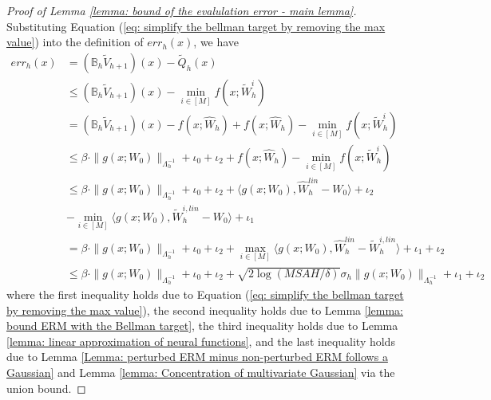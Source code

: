 \documentclass{article} \usepackage{iclr2023/iclr2023_conference,times}
\begin{document}
\begin{proof}[Proof of Lemma \ref{lemma: bound of the evalulation error - main lemma}]
Substituting Equation (\ref{eq: simplify the bellman target by removing the max value}) into the definition of $err_h(x)$, we have
\begin{align*}
    err_h(x) &= (\mathbb{B}_h \tilde{V}_{h+1})(x) -\tilde{Q}_h(x) \\ 
    &\leq (\mathbb{B}_h \tilde{V}_{h+1})(x) - \min_{i \in [M]} f(x; \tilde{W}^i_h) \\ 
    &= (\mathbb{B}_h \tilde{V}_{h+1})(x) - f(x; \hat{W}_h) + f(x; \hat{W}_h)  -\min_{i \in [M]} f(x; \tilde{W}^i_h) \\ 
    &\leq  \beta  \cdot \| g(x; W_0) \|_{\Lambda_h^{-1}} + \iota_0 + \iota_2 + f(x; \hat{W}_h)  -\min_{i \in [M]} f(x; \tilde{W}^i_h) \\ 
    &\leq  \beta  \cdot \| g(x; W_0) \|_{\Lambda_h^{-1}} + \iota_0 + \iota_2 + \langle g(x; W_0), \hat{W}_h^{lin} - W_0 \rangle + \iota_2 \\
    &- \min_{i \in [M]}\langle g(x; W_0), \tilde{W}_h^{i,lin} - W_0 \rangle + \iota_1 \\ 
    &=  \beta  \cdot \| g(x; W_0) \|_{\Lambda_h^{-1}} + \iota_0 + \iota_2 + \max_{i \in [M]}\langle g(x; W_0), \hat{W}_h^{lin} - \tilde{W}_h^{i,lin} \rangle  + \iota_1 + \iota_2 \\ 
    &\leq  \beta  \cdot \| g(x; W_0) \|_{\Lambda_h^{-1}} + \iota_0 + \iota_2 + \sqrt{2 \log (MSAH / \delta)}  \sigma_h \| g(x; W_0)\|_{\Lambda^{-1}_h} +  \iota_1 + \iota_2
\end{align*}
where the first inequality holds due to Equation (\ref{eq: simplify the bellman target by removing the max value}), the second inequality holds due to Lemma \ref{lemma: bound ERM with the Bellman target}, the third inequality holds due to Lemma \ref{lemma: linear approximation of neural functions}, and the last inequality holds due to Lemma \ref{Lemma: perturbed ERM minus non-perturbed ERM follows a Gaussian} and Lemma \ref{lemma: Concentration of multivariate Gaussian} via the union bound.

\end{proof}
\end{document}
